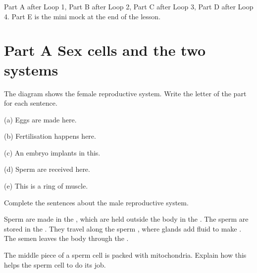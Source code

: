 \documentclass[11pt]{article}
\begin{document}
Part A after Loop 1, Part B after Loop 2, Part C after Loop 3, Part D after Loop 4. Part E is the mini mock at the end of the lesson.


\section{Part A \textperiodcentered{} Sex cells and the two systems}
\Q The diagram shows the female reproductive system. Write the letter of the part for each sentence.
\par\vspace{1mm}
\begin{minipage}[t]{0.50\linewidth}\vspace{0pt}\FigFemaleFront[5mm]\end{minipage}\hfill
\begin{minipage}[t]{0.46\linewidth}\vspace{4mm}\raggedright
(a) Eggs are made here. \hfill{}\par\vspace{3.5mm}
(b) Fertilisation happens here. \hfill{}\par\vspace{3.5mm}
(c) An embryo implants in this. \hfill{}\par\vspace{3.5mm}
(d) Sperm are received here. \hfill{}\par\vspace{3.5mm}
(e) This is a ring of muscle. \hfill{}
\end{minipage}\par\vspace{2mm}

\Q Complete the sentences about the male reproductive system.
\par Sperm are made in the , which are held outside the body in the .
The sperm are stored in the . They travel along the sperm , where glands add fluid to make .
The semen leaves the body through the .\par\vspace{2mm}

\Q The middle piece of a sperm cell is packed with mitochondria. Explain how this helps the sperm cell to do its job.
\end{document}
